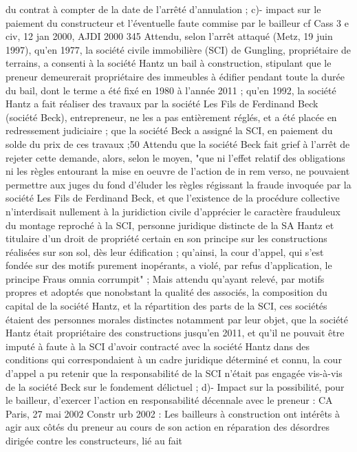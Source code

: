 \documentclass[11pt,a4paper]{report}
\begin{document}
	du contrat à compter de la date de l’arrêté d’annulation ;
	c)- impact sur le paiement du constructeur et l’éventuelle faute commise par le bailleur cf Cass 3 e civ, 12
	jan 2000, AJDI 2000 345
	Attendu, selon l'arrêt attaqué (Metz, 19 juin 1997), qu'en 1977, la société civile immobilière (SCI) de Gungling,
	propriétaire de terrains, a consenti à la société Hantz un bail à construction, stipulant que le preneur
	demeurerait propriétaire des immeubles à édifier pendant toute la durée du bail, dont le terme a été fixé en 1980
	à l'année 2011 ; qu'en 1992, la société Hantz a fait réaliser des travaux par la société Les Fils de Ferdinand
	Beck (société Beck), entrepreneur, ne les a pas entièrement réglés, et a été placée en redressement judiciaire ;
	que la société Beck a assigné la SCI, en paiement du solde du prix de ces travaux ;50
	Attendu que la société Beck fait grief à l'arrêt de rejeter cette demande, alors, selon le moyen, "que ni l'effet
	relatif des obligations ni les règles entourant la mise en oeuvre de l'action de in rem verso, ne pouvaient
	permettre aux juges du fond d'éluder les règles régissant la fraude invoquée par la société Les Fils de Ferdinand
	Beck, et que l'existence de la procédure collective n'interdisait nullement à la juridiction civile d'apprécier le
	caractère frauduleux du montage reproché à la SCI, personne juridique distincte de la SA Hantz et titulaire d'un
	droit de propriété certain en son principe sur les constructions réalisées sur son sol, dès leur édification ;
	qu'ainsi, la cour d'appel, qui s'est fondée sur des motifs purement inopérants, a violé, par refus d'application, le
	principe Fraus omnia corrumpit" ;
	Mais attendu qu'ayant relevé, par motifs propres et adoptés que nonobstant la qualité des associés, la
	composition du capital de la société Hantz, et la répartition des parts de la SCI, ces sociétés étaient des
	personnes morales distinctes notamment par leur objet, que la société Hantz était propriétaire des constructions
	jusqu'en 2011, et qu'il ne pouvait être imputé à faute à la SCI d'avoir contracté avec la société Hantz dans des
	conditions qui correspondaient à un cadre juridique déterminé et connu, la cour d'appel a pu retenir que la
	responsabilité de la SCI n'était pas engagée vis-à-vis de la société Beck sur le fondement délictuel ;
	d)- Impact sur la possibilité, pour le bailleur, d’exercer l’action en responsabilité décennale avec le
	preneur : CA Paris, 27 mai 2002 Constr urb 2002  : Les bailleurs à construction ont intérêts à agir aux
	côtés du preneur au cours de son action en réparation des désordres dirigée contre les constructeurs, lié au fait
\end{document}
